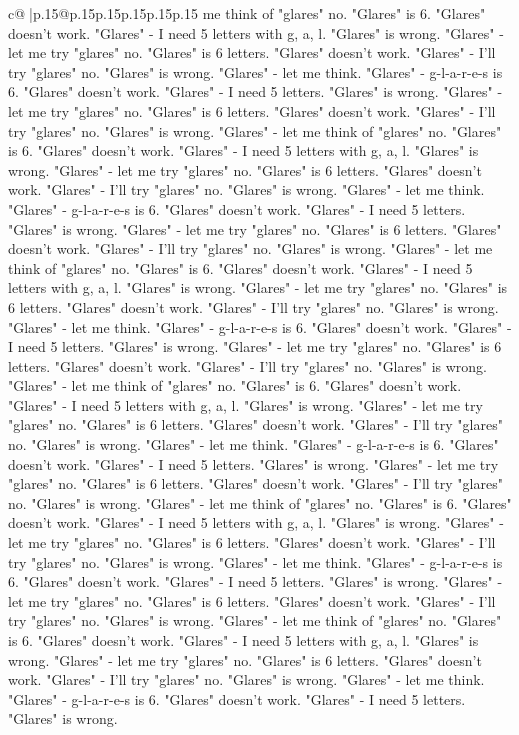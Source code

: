 \documentclass{article}
\begin{document}
{\begin{supertabular}{c@{$\;$}|p{.15\linewidth}@{}p{.15\linewidth}p{.15\linewidth}p{.15\linewidth}p{.15\linewidth}p{.15\linewidth}}
{{{me think of "glares" no. "Glares" is 6. "Glares" doesn't work. "Glares" {-} I need 5 letters with g, a, l. "Glares" is wrong. "Glares" {-} let me try "glares" no. "Glares" is 6 letters. "Glares" doesn't work. "Glares" {-} I'll try "glares" no. "Glares" is wrong. "Glares" {-} let me think. "Glares" {-} g{-}l{-}a{-}r{-}e{-}s is 6. "Glares" doesn't work. "Glares" {-} I need 5 letters. "Glares" is wrong. "Glares" {-} let me try "glares" no. "Glares" is 6 letters. "Glares" doesn't work. "Glares" {-} I'll try "glares" no. "Glares" is wrong. "Glares" {-} let me think of "glares" no. "Glares" is 6. "Glares" doesn't work. "Glares" {-} I need 5 letters with g, a, l. "Glares" is wrong. "Glares" {-} let me try "glares" no. "Glares" is 6 letters. "Glares" doesn't work. "Glares" {-} I'll try "glares" no. "Glares" is wrong. "Glares" {-} let me think. "Glares" {-} g{-}l{-}a{-}r{-}e{-}s is 6. "Glares" doesn't work. "Glares" {-} I need 5 letters. "Glares" is wrong. "Glares" {-} let me try "glares" no. "Glares" is 6 letters. "Glares" doesn't work. "Glares" {-} I'll try "glares" no. "Glares" is wrong. "Glares" {-} let me think of "glares" no. "Glares" is 6. "Glares" doesn't work. "Glares" {-} I need 5 letters with g, a, l. "Glares" is wrong. "Glares" {-} let me try "glares" no. "Glares" is 6 letters. "Glares" doesn't work. "Glares" {-} I'll try "glares" no. "Glares" is wrong. "Glares" {-} let me think. "Glares" {-} g{-}l{-}a{-}r{-}e{-}s is 6. "Glares" doesn't work. "Glares" {-} I need 5 letters. "Glares" is wrong. "Glares" {-} let me try "glares" no. "Glares" is 6 letters. "Glares" doesn't work. "Glares" {-} I'll try "glares" no. "Glares" is wrong. "Glares" {-} let me think of "glares" no. "Glares" is 6. "Glares" doesn't work. "Glares" {-} I need 5 letters with g, a, l. "Glares" is wrong. "Glares" {-} let me try "glares" no. "Glares" is 6 letters. "Glares" doesn't work. "Glares" {-} I'll try "glares" no. "Glares" is wrong. "Glares" {-} let me think. "Glares" {-} g{-}l{-}a{-}r{-}e{-}s is 6. "Glares" doesn't work. "Glares" {-} I need 5 letters. "Glares" is wrong. "Glares" {-} let me try "glares" no. "Glares" is 6 letters. "Glares" doesn't work. "Glares" {-} I'll try "glares" no. "Glares" is wrong. "Glares" {-} let me think of "glares" no. "Glares" is 6. "Glares" doesn't work. "Glares" {-} I need 5 letters with g, a, l. "Glares" is wrong. "Glares" {-} let me try "glares" no. "Glares" is 6 letters. "Glares" doesn't work. "Glares" {-} I'll try "glares" no. "Glares" is wrong. "Glares" {-} let me think. "Glares" {-} g{-}l{-}a{-}r{-}e{-}s is 6. "Glares" doesn't work. "Glares" {-} I need 5 letters. "Glares" is wrong. "Glares" {-} let me try "glares" no. "Glares" is 6 letters. "Glares" doesn't work. "Glares" {-} I'll try "glares" no. "Glares" is wrong. "Glares" {-} let me think of "glares" no. "Glares" is 6. "Glares" doesn't work. "Glares" {-} I need 5 letters with g, a, l. "Glares" is wrong. "Glares" {-} let me try "glares" no. "Glares" is 6 letters. "Glares" doesn't work. "Glares" {-} I'll try "glares" no. "Glares" is wrong. "Glares" {-} let me think. "Glares" {-} g{-}l{-}a{-}r{-}e{-}s is 6. "Glares" doesn't work. "Glares" {-} I need 5 letters. "Glares" is wrong. }}}
\end{supertabular}}
\end{document}
